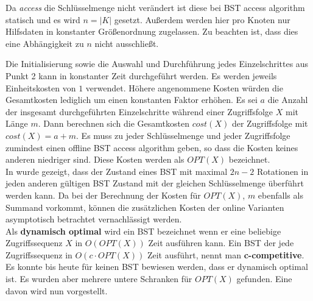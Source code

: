 \documentclass[a4paper,12pt]{article}
\begin{document}
 
 \noindent  Da \textit{access} die Schlüsselmenge nicht verändert ist diese bei BST access algorithm statisch und es wird $n = \vert K \vert$ gesetzt. Außerdem werden hier pro Knoten nur Hilfsdaten in konstanter Größenordnung zugelassen. Zu beachten ist, dass dies eine Abhängigkeit zu $n$ nicht ausschließt.
 
 \noindent Die Initialisierung sowie die Auswahl und Durchführung jedes Einzelschrittes aus Punkt 2 kann in konstanter Zeit durchgeführt werden. Es werden jeweils Einheitskosten von $1$ verwendet. Höhere angenommene Kosten würden die Gesamtkosten lediglich um einen konstanten Faktor erhöhen. Es sei $a$ die Anzahl der insgesamt durchgeführten Einzelschritte während einer Zugriffsfolge $X$ mit Länge $m$. Dann berechnen sich die Gesamtkosten $\mathit{cost(X)}$ der Zugriffsfolge mit $\mathit{cost(X)} = a + m$. Es muss zu jeder Schlüsselmenge und jeder Zugriffsfolge zumindest einen offline BST access algorithm geben, so dass die Kosten keines anderen niedriger sind. Diese Kosten werden als $\mathit{OPT}\left(X\right)$ bezeichnet.\\  In \cite{nRotations} wurde gezeigt, dass der Zustand eines BST mit maximal $2n -2$ Rotationen in jeden anderen gültigen BST Zustand mit der gleichen Schlüsselmenge überführt werden kann. Da bei der Berechnung der Kosten für  $\mathit{OPT(X)}$, $m$ ebenfalls als Summand vorkommt, können die zusätzlichen Kosten der online Varianten asymptotisch betrachtet vernachlässigt werden. \\
 \noindent Als \textbf{dynamisch optimal } wird ein BST bezeichnet wenn er eine beliebige Zugriffssequenz $X$ in $O\left(\mathit{OPT}\left(X\right)\right)$ Zeit ausführen kann. Ein BST der jede Zugriffssequenz in $O\left(c \cdot \mathit{OPT}\left(X\right)\right)$ Zeit ausführt, nennt man \textbf{c-competitive}. Es konnte bis heute für keinen BST bewiesen werden, dass er dynamisch optimal ist. Es wurden aber mehrere untere Schranken für $\mathit{OPT}\left(X\right)$ gefunden. Eine davon wird  nun vorgestellt.
\end{document}
